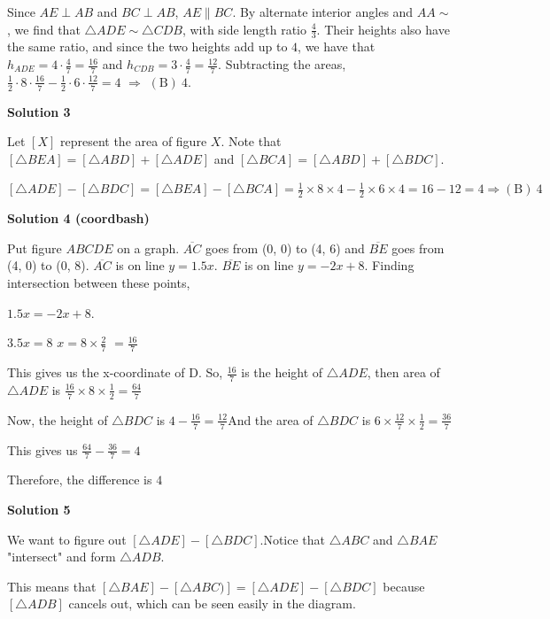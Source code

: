\begin{enumerate}
Since $AE \perp AB$ and $BC \perp AB$, $AE \parallel BC$. By alternate interior angles and $AA\sim$, we find that $\triangle ADE \sim \triangle CDB$, with side length ratio $\frac{4}{3}$. Their heights also have the same ratio, and since the two heights add up to $4$, we have that $h_{ADE} = 4 \cdot \frac{4}{7} = \frac{16}{7}$ and $h_{CDB} = 3 \cdot \frac 47 = \frac {12}7$. Subtracting the areas, $\frac{1}{2} \cdot 8 \cdot \frac {16}7 - \frac 12 \cdot 6 \cdot \frac{12}7 = 4$ $\Rightarrow$ $\boxed{\mathrm{(B)}\ 4}$.

 



\textbf{Solution 3}

Let $[X]$ represent the area of figure $X$. Note that $[\triangle BEA]=[\triangle ABD]+[\triangle ADE]$ and $[\triangle BCA]=[\triangle ABD]+[\triangle BDC]$.

 $[\triangle ADE]-[\triangle BDC]=[\triangle BEA]-[\triangle BCA]=\frac{1}{2}\times8\times4-\frac{1}{2}\times6\times4= 16-12=4\Rightarrow\boxed{\mathrm{(B)}\ 4}$




\textbf{Solution 4 (coordbash)}

Put figure $ABCDE$ on a graph. $\overline{AC}$ goes from (0, 0) to (4, 6) and $\overline{BE}$ goes from (4, 0) to (0, 8). $\overline{AC}$ is on line $y = 1.5x$. $\overline{BE}$ is on line $y = -2x + 8$. Finding intersection between these points,

 $1.5x = -2x + 8$. 

 $3.5x = 8$
$x = 8 \times \frac{2}{7}$
$= \frac{16}{7}$

 This gives us the x-coordinate of D. So, $\frac{16}{7}$ is the height of $\triangle ADE$, then area of $\triangle ADE$ is $\frac{16}{7} \times 8 \times \frac{1}{2}$$= \frac{64}{7}$

 Now, the height of $\triangle BDC$ is $4-\frac{16}{7} = \frac{12}{7}$And the area of $\triangle BDC$ is $6 \times \frac{12}{7} \times \frac{1}{2} = \frac{36}{7}$

 This gives us $\frac{64}{7} - \frac{36}{7} = 4$

 Therefore, the difference is $4$




\textbf{Solution 5}

We want to figure out $[\triangle ADE] - [\triangle BDC]$.Notice that $\triangle ABC$ and $\triangle BAE$ "intersect" and form $\triangle ADB$.

 This means that $[\triangle BAE] - [\triangle ABC)] = [\triangle ADE] - [\triangle BDC]$ because $[\triangle ADB]$ cancels out, which can be seen easily in the diagram.


\end{enumerate}
